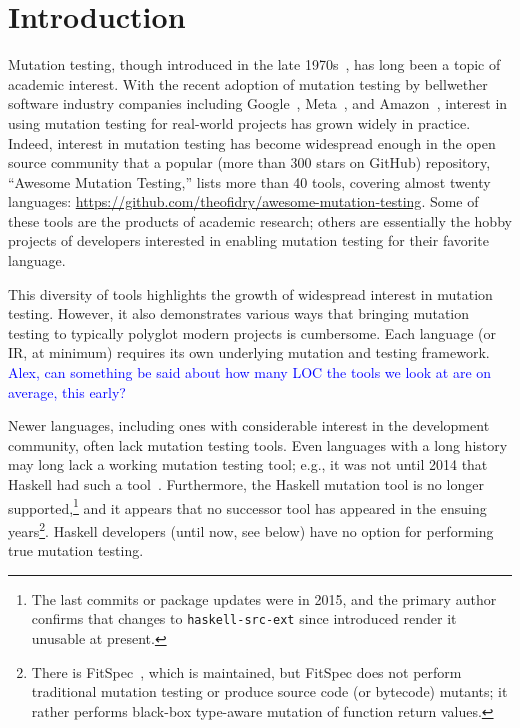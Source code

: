 \documentclass[sigconf,review, anonymous]{acmart}
\newcommand{\clg}[1]{\textcolor{blue}{#1}}
\begin{document}
\maketitle



\section{Introduction}

Mutation testing, though introduced in the late
1970s~\cite{demillo1978hints,mathur2012foundations,demillo1978hints},
has long been a topic of academic interest.  With the recent adoption of mutation
testing by bellwether software industry companies including
Google~\cite{GoogleMut}, Meta~\cite{BellerFacebookMutation}, and
Amazon~\cite{AmazonMut}, interest in using mutation testing for
real-world projects has grown widely in practice. 
%
Indeed, interest in mutation testing has become widespread enough in the open
source community that a popular (more than 300 stars on GitHub)
repository, ``Awesome Mutation Testing,'' lists more than 40 tools,
covering almost twenty languages:
\url{https://github.com/theofidry/awesome-mutation-testing}.  Some of
these tools are the products of academic research; others are
essentially the hobby projects of developers interested in enabling
mutation testing for their favorite language.

This diversity of tools highlights the growth of widespread interest in mutation
testing.  However, it also demonstrates various ways that bringing mutation testing to
typically polyglot modern projects is cumbersome. Each language (or IR, at
minimum) requires its own underlying mutation and testing framework.
\clg{Alex, can something be said about 
  how many LOC the tools we look at are on average, this early?} 

Newer languages, including ones with considerable interest
in the development community, often lack mutation testing tools.  Even
languages with a long history may long lack a working mutation testing
tool; e.g., it was not until 2014 that Haskell had such a tool~\cite{mucheck}. 
%
Furthermore, the Haskell mutation tool is no longer
supported,\footnote{The last commits or package updates were in 2015, and the
primary author confirms that changes to {\tt haskell-src-ext} since
introduced render it unusable at present.} and it
appears that no successor tool has appeared in the ensuing
years\footnote{There is FitSpec~\cite{FitSpec}, which is maintained,
  but FitSpec does not perform traditional mutation testing or produce
  source code (or bytecode) mutants; it rather
  performs black-box type-aware mutation of function return values.}.
Haskell developers (until now, see below) have no option for
performing true mutation testing.
\end{document}
